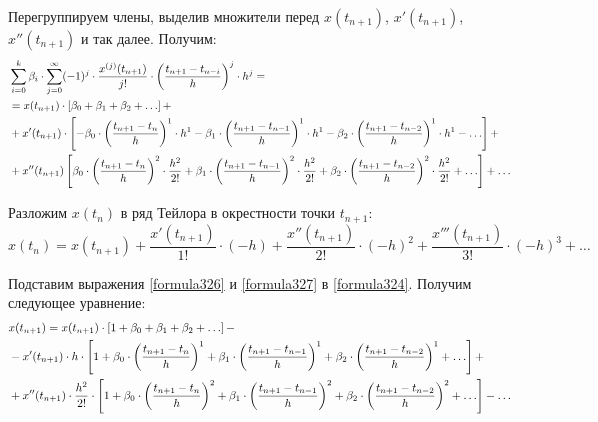 Перегруппируем члены, выделив множители перед $x(t_{n+1})$, $x'(t_{n+1})$, $x''(t_{n+1})$ и так далее. Получим:
\begin{align}
\label{formula326}
&\sum_{i=0}^{k}\beta_i\cdot \sum_{j=0}^{\infty} (-1)^j \cdot \frac{x^{(j)}(t_{n+1})}{j!}\cdot \left(\frac{t_{n+1}-t_{n-i}}{h} \right)^j \cdot h^j = \notag \\
&= x(t_{n+1})\cdot \left[\beta_0+\beta_1+\beta_2+\dots \right] + \\
&+ x'(t_{n+1})\cdot \left[-\beta_0 \cdot \left(\frac{t_{n+1}-t_n}{h}\right)^1 \cdot h^1 -\beta_1 \cdot \left(\frac{t_{n+1}-t_{n-1}}{h}\right)^1 \cdot h^1 -\beta_2 \cdot \left(\frac{t_{n+1}-t_{n-2}}{h}\right)^1 \cdot h^1 -\dots \right]	+ \notag \\
&+ x''(t_{n+1}) \left[\beta_0 \cdot \left(\frac{t_{n+1}-t_n}{h}\right)^2 \cdot \frac{h^2}{2!} + \beta_1 \cdot \left(\frac{t_{n+1}-t_{n-1}}{h}\right)^2 \cdot \frac{h^2}{2!} + \beta_2 \cdot \left(\frac{t_{n+1}-t_{n-2}}{h}\right)^2 \cdot \frac{h^2}{2!} + \dots \right] + \dots \notag
\end{align}

Разложим $x(t_n)$ в ряд Тейлора в окрестности точки $t_{n+1}$:
\begin{equation}
\label{formula327}
x(t_n)=x(t_{n+1})+\frac{x'(t_{n+1})}{1!}\cdot (-h) + \frac{x''(t_{n+1})}{2!}\cdot (-h)^2 + \frac{x'''(t_{n+1})}{3!}\cdot (-h)^3 + \dots
\end{equation}

Подставим выражения \eqref{formula326} и \eqref{formula327} в \eqref{formula324}. Получим следующее уравнение:
\begin{align}
\label{formula328}
&x(t_{n+1})=x(t_{n+1})\cdot \left[1+\beta_0+\beta_1+\beta_2+\dots \right] - \notag \\
&- x'(t_{n+1})\cdot h \cdot \left[1 + \beta_0 \cdot \left(\frac{t_{n+1}-t_n}{h}\right)^1 +\beta_1 \cdot \left(\frac{t_{n+1}-t_{n-1}}{h}\right)^1 +\beta_2 \cdot \left(\frac{t_{n+1}-t_{n-2}}{h}\right)^1 +\dots \right] + \notag \\
&+ x''(t_{n+1})\cdot \frac{h^2}{2!} \cdot \left[1 + \beta_0 \cdot \left(\frac{t_{n+1}-t_n}{h}\right)^2 +\beta_1 \cdot \left(\frac{t_{n+1}-t_{n-1}}{h}\right)^2 +\beta_2 \cdot \left(\frac{t_{n+1}-t_{n-2}}{h}\right)^2 +\dots \right] -\dots
\end{align} 

